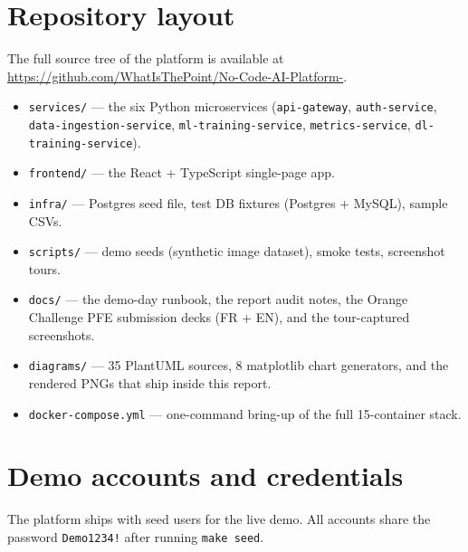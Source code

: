 \documentclass[12pt, a4paper, oneside]{report}
\begin{document}
\chapter{Repository layout}
\label{annex:repo}

The full source tree of the platform is available at
\url{https://github.com/WhatIsThePoint/No-Code-AI-Platform-}.

\begin{itemize}
    \item \texttt{services/} --- the six Python microservices
        (\texttt{api-gateway}, \texttt{auth-service},
        \texttt{data-ingestion-service}, \texttt{ml-training-service},
        \texttt{metrics-service}, \texttt{dl-training-service}).
    \item \texttt{frontend/} --- the React + TypeScript single-page app.
    \item \texttt{infra/} --- Postgres seed file, test DB fixtures
        (Postgres + MySQL), sample CSVs.
    \item \texttt{scripts/} --- demo seeds (synthetic image dataset),
        smoke tests, screenshot tours.
    \item \texttt{docs/} --- the demo-day runbook, the report audit
        notes, the Orange Challenge PFE submission decks (FR + EN),
        and the tour-captured screenshots.
    \item \texttt{diagrams/} --- 35 PlantUML sources, 8 matplotlib
        chart generators, and the rendered PNGs that ship inside this
        report.
    \item \texttt{docker-compose.yml} --- one-command bring-up of the
        full 15-container stack.
\end{itemize}

\chapter{Demo accounts and credentials}
\label{annex:accounts}

The platform ships with seed users for the live demo. All accounts
share the password \texttt{Demo1234!} after running \texttt{make seed}.
\end{document}
